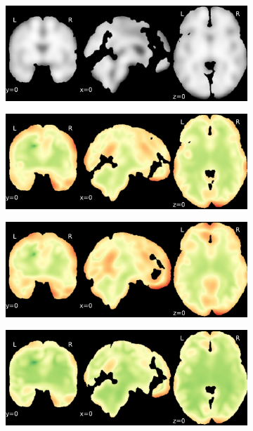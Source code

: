 \documentclass{article}
\begin{document}
\begin{landscape}
\begin{figure}
        \begin{subfigure}[t]{0.2\paperheight}
            \centering
            \includegraphics[width=\textwidth]{figures/sig/15mm/ieee_ds000256_sub-CTS210.pdf}
        \end{subfigure}
        \begin{subfigure}[t]{0.2\paperheight}
            \centering
            \includegraphics[width=\textwidth]{figures/sig/15mm/rr_ds000256_sub-CTS210_sig.pdf}
        \end{subfigure}
        \begin{subfigure}[t]{0.2\paperheight}
            \centering
            \includegraphics[width=\textwidth]{figures/sig/15mm/rs_ds000256_sub-CTS210_sig.pdf}
        \end{subfigure}
        \begin{subfigure}[t]{0.2\paperheight}
            \centering
            \includegraphics[width=\textwidth]{figures/sig/15mm/rr.rs_ds000256_sub-CTS210_sig.pdf}

\end{subfigure}
\end{figure}
\end{landscape}
\end{document}
